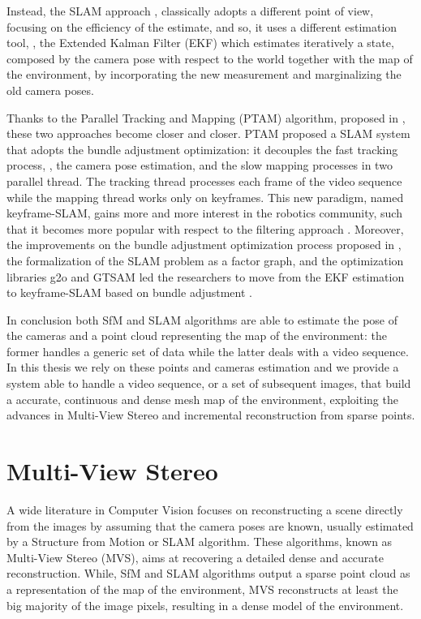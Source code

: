 Instead, the SLAM approach \cite{davison2007monoslam,ceriani2014single,grasa2011ekf}, classically adopts a different point of view, focusing on the efficiency of the estimate, and so, it uses a different estimation tool, \ie, the Extended Kalman Filter (EKF) which estimates iteratively a state, composed by the camera pose with respect to the world together with the map of the environment, by incorporating the new measurement and marginalizing the old camera poses.  


Thanks to the Parallel Tracking and Mapping (PTAM) algorithm, proposed in \cite{klein_murray07}, these two approaches become closer and closer. PTAM proposed a SLAM system that adopts the bundle adjustment optimization: it decouples the fast tracking process, \ie, the camera pose estimation, and the slow mapping processes in two parallel thread.  
The tracking thread processes each frame of the video sequence while the mapping thread works only on keyframes. 
This new paradigm, named keyframe-SLAM, gains more and more interest in the robotics community, such that it becomes more popular with respect to the filtering approach \cite{strasdat2010real}.
Moreover, the improvements on the bundle adjustment optimization process proposed in \cite{kaess2008isam},  the formalization of the SLAM problem as a factor graph\cite{thrun2006graph}, and the optimization libraries g2o \cite{kummerle2011g} and GTSAM \cite{dellaert2012factor} led the researchers to move from the EKF estimation to keyframe-SLAM based on bundle adjustment \cite{strasdat11,sunderhauf2012towards,johannsson2013temporally}. 


In conclusion both SfM and SLAM algorithms are able to estimate the pose of the cameras and a point cloud representing the map of the environment: the former handles a generic set of data while the latter deals with a video sequence. 
In this thesis we rely on these points and cameras estimation and we provide a system able to handle a video sequence, or a set of subsequent images, that build a accurate, continuous and dense mesh map of the environment, exploiting the advances in Multi-View Stereo and incremental reconstruction from sparse points.

\section{Multi-View Stereo}


A wide literature in Computer Vision focuses on reconstructing a scene directly from the images by assuming that the camera poses are known, usually estimated by a Structure from Motion or SLAM algorithm.
These algorithms, known as Multi-View Stereo (MVS), aims at recovering a detailed dense and accurate reconstruction. 
While, SfM and SLAM algorithms output a sparse point cloud as a representation of the map of the environment, MVS reconstructs at least the big majority of the image pixels, resulting in a dense model of the environment.

